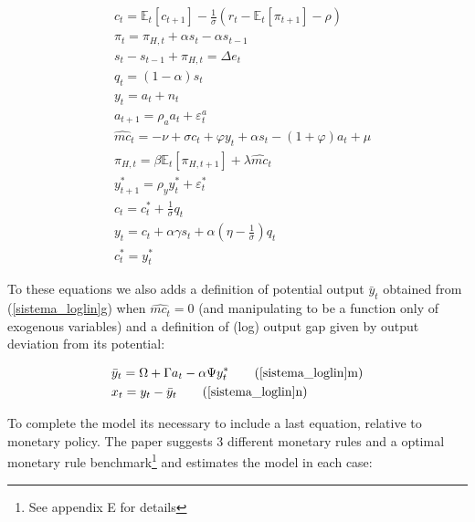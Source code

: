 \documentclass{article}
\newcommand{\Et}{\mathbb{E}_t}
\begin{document}
\begin{subequations}
\label{sistema_loglin}
    \begin{align}
        &c_t = \Et[c_{t+1}] - \frac{1}{\sigma} (r_t - \Et[\pi_{t+1}] - \rho)\\
        &\pi_t = \pi_{H,t} + \alpha s_t - \alpha s_{t-1}\\
        &s_{t} - s_{t-1} + \pi_{H,t} = \Delta e_t \\
        &q_t = (1-\alpha) s_t\\
        &y_t = a_t +  n_t\\
        &a_{t+1} = \rho_a a_t + \varepsilon^a_t\\
        &\hat{mc}_{t} = -\nu + \sigma c_t + \varphi y_t + \alpha s_t - (1+ \varphi )a_t + \mu\\
        & \pi_{H,t} = \beta \Et[\pi_{H,t+1}] + \lambda \hat{mc}_t\\
        &y^*_{t+1} = \rho_y y^*_t + \varepsilon^*_t\\
        &c_t = c_t^* + \frac{1}{\sigma} q_t\\
        &y_t = c_t + \alpha \gamma s_t + \alpha \left( \eta - \frac{1}{\sigma} \right) q_t\\
        &c_t^* = y_t^*
    \end{align}
\end{subequations}

To these equations we also adds a definition of potential output $\bar y_t$ obtained from (\ref{sistema_loglin}g) when $\hat{mc_t} = 0$ (and manipulating to be a function only of exogenous variables) and a definition of (log) output gap given by output deviation from its potential:

\begin{subequations}
    \begin{align}
        &\bar y_t = \Omega + \Gamma a_t - \alpha \Psi y_t^* \tag{\ref{sistema_loglin}m}\\
        &x_t = y_t - \bar y_t \tag{\ref{sistema_loglin}n}
    \end{align}
\end{subequations}

To complete the model its necessary to include a last equation, relative to monetary policy. The paper suggests 3 different monetary rules and a optimal monetary rule benchmark\footnote{See appendix E for details} and estimates the model in each case:
\end{document}
